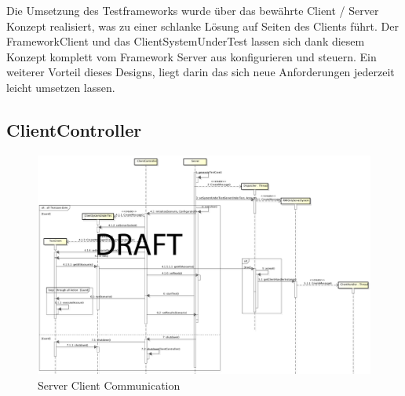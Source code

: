 Die Umsetzung des Testframeworks wurde über das bewährte Client / Server Konzept realisiert, was zu einer schlanke Lösung auf Seiten des Clients führt. Der FrameworkClient und das ClientSystemUnderTest lassen sich dank die\-sem Konzept komplett vom Framework Server aus konfigurieren und steuern. Ein weiterer Vorteil dieses Designs, liegt darin das sich neue Anforderungen jederzeit leicht umsetzen lassen.


\subsection{ClientController}
\label{sec:clientController}


\begin{figure}
\begin{center}
\includegraphics[scale=0.2]{image_testFramework/TestFWServerClientSeq.png}
\end{center}
\caption{Server Client Communication}
\end{figure}
 

